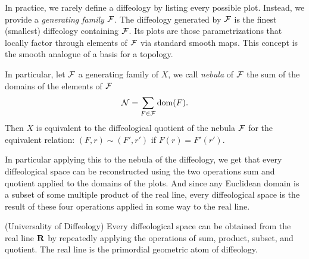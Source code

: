   \begin{article}
    In practice,
    we rarely define a diffeology by listing every possible plot.
    Instead,
    we provide a \emph{generating family} $\mathcal{F}$.
    The diffeology generated by $\mathcal{F}$ is the finest (smallest) diffeology containing $\mathcal{F}$.
    Its plots are those parametrizations that locally factor through elements of $\mathcal{F}$ via standard smooth maps.
    This concept is the smooth analogue of a basis for a topology.
    
    In particular,
    let $\mathcal{F}$ a generating family of $X$,
    we call \emph{nebula} of $\mathcal{F}$ the sum of the domains of the elements of $\mathcal{F}$
    $$
      \mathcal{N} = \sum_{F \in \mathcal{F}} \operatorname{dom}(F).
      $$
    Then $X$ is equivalent to the diffeological quotient of the nebula $\mathcal{F}$ for the equivalent relation:
    $(F,r) \sim (F',r')$ if $F(r) = F'(r')$.
    
    In particular applying this to the nebula of the diffeology,
    we get that every diffeological space can be reconstructed using the two operations sum and quotient applied to the domains of the plots.
    And since any Euclidean domain is a subset of some multiple product of the real line,
    every diffeological space is the result of these four operations applied in some way to the real line.
    
    \begin{proposition}\textup{(Universality of Diffeology)}
      Every diffeological space can be obtained from the real line ${\mathbf{R}}$ by
      repeatedly applying the operations of sum, product, subset, and quotient.
      The real line is the primordial geometric atom of diffeology.
    \end{proposition}
  \end{article}
  
